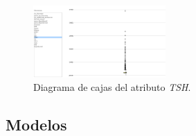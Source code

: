 \documentclass[osajnl,twocolumn,showpacs,superscriptaddress,10pt,floatfix]{revtex4-1} %
\begin{document}
\begin{figure}[H]
    \centering
    \includegraphics[width=0.45\textwidth]{analysis/box_plot_TSH}
    \caption{Diagrama de cajas del atributo \textit{TSH}.}
    \label{figure:box_plot_TSH}
\end{figure}

\onecolumngrid

\clearpage

\subsection{Modelos}
\end{document}
